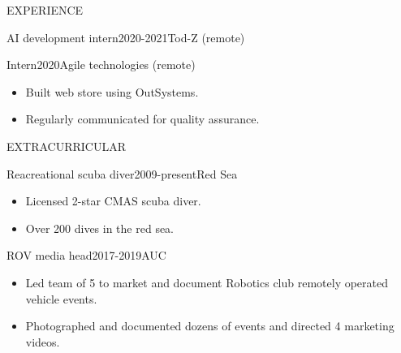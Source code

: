 \documentclass{resume}
\begin{document}
\begin{minipage}[t]{0.44\textwidth}
\begin{rsection}{\MakeUppercase{experience}}
\begin{rcontent}{AI development intern}{2020-2021}{Tod-Z (remote)}
		\end{rcontent}
		\divider
		\begin{rcontent}{Intern}{2020}{Agile technologies (remote)}
			\begin{itemize}
				\item Built web store using OutSystems.
				\item Regularly communicated for quality assurance.
			\end{itemize}
		\end{rcontent}

	\end{rsection}

	\begin{rsection}{\MakeUppercase{extracurricular}}

		\begin{rcontent}{Reacreational scuba diver}{2009-present}{Red Sea}
			\begin{itemize}
				\item Licensed 2-star CMAS scuba diver.
				\item Over 200 dives in the red sea.
			\end{itemize}
		\end{rcontent}
		\divider
		\begin{rcontent}{ROV media head}{2017-2019}{AUC}
			\begin{itemize}
				\item Led team of 5 to market and document Robotics club remotely operated vehicle events.
				\item Photographed and documented dozens of events and directed 4 marketing videos.
			\end{itemize}
		\end{rcontent}


\end{rsection}
\end{minipage}
\end{document}

